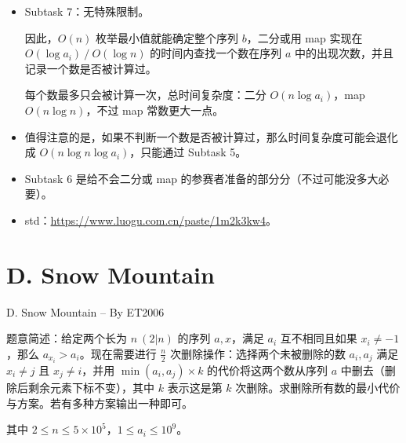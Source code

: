 \documentclass[10pt,aspectratio=43,mathserif]{beamer}
\begin{document}
\begin{frame}
	
	\begin{itemize} \setlength{\parskip}{0.4\baselineskip}

		\item Subtask 7：无特殊限制。

		因此，$O(n)$ 枚举最小值就能确定整个序列 $b$，二分或用 map 实现在 $O(\log a_i)\ /\ O(\log n)$ 的时间内查找一个数在序列 $a$ 中的出现次数，并且记录一个数是否被计算过。

		每个数最多只会被计算一次，总时间复杂度：二分 $O(n\log a_i)$，map $O(n\log n)$，不过 map 常数更大一点。

		\item 值得注意的是，如果不判断一个数是否被计算过，那么时间复杂度可能会退化成 $O(n\log n\log a_i)$，只能通过 Subtask 5。

		\item Subtask 6 是给不会二分或 map 的参赛者准备的部分分（不过可能没多大必要）。

		\item std：\url{https://www.luogu.com.cn/paste/1m2k3kw4}。

	\end{itemize}

\end{frame}


\section{D. Snow Mountain}

\begin{frame} \setlength{\parskip}{0.4\baselineskip}

	\large{D. Snow Mountain -- By ET2006}

	题意简述：给定两个长为 $n\ (2|n)$ 的序列 $a,x$，满足 $a_i$ 互不相同且如果 $x_i \neq -1$，那么 $a_{x_i}>a_i$。现在需要进行 $\frac{n}{2}$ 次删除操作：选择两个未被删除的数 $a_i,a_j$ 满足 $x_i\neq j$ 且 $x_j\neq i$，并用 $\min(a_i,a_j)\times k$ 的代价将这两个数从序列 $a$ 中删去（删除后剩余元素下标不变），其中 $k$ 表示这是第 $k$ 次删除。求删除所有数的最小代价与方案。若有多种方案输出一种即可。

	其中 $2\leq n\leq 5\times 10^5$，$1\leq a_i\leq 10^9$。

\end{frame}
\end{document}
